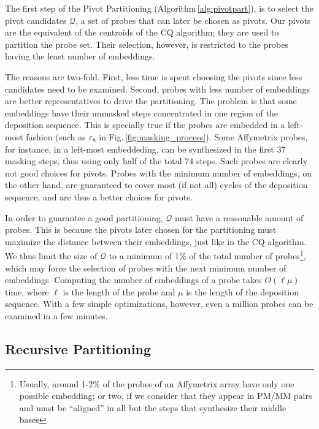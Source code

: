\documentclass[runningheads]{llncs}
\begin{document}
The first step of the Pivot Partitioning (Algorithm\,\ref{alg:pivotpart}), is to
select the pivot candidates $\mathcal{Q}$, a set of probes that can later be
chosen as pivots. Our pivots are the equivalent of the centroids of the CQ
algorithm; they are used to partition the probe set. Their
selection, however, is restricted to the probes having the least number of
embeddings.

The reasons are two-fold. First, less time is spent choosing the pivots
since less candidates need to be examined.
Second, probes with less number of embeddings are better representatives to drive
the partitioning. The problem is that some embeddings have their unmasked steps
concentrated in one region of the deposition sequence. This is specially true if
the probes are embedded in a left-most fashion (such as $\varepsilon_8$ in
Fig.\,\ref{fig:masking_process}). Some Affymetrix probes, for instance, in a
left-most embeddeding, can be synthesized in the first 37 masking steps, thus
using only half of the total 74 steps. Such probes are clearly not good choices
for pivots. Probes with the minimum number of embeddings, on the other hand,
are guaranteed to cover most (if not all) cycles of the deposition sequence,
and are thus a better choices for pivots.

In order to guarantee a good partitioning, $\mathcal{Q}$ must have a reasonable
amount of probes. This is because the pivots later chosen for the partitioning
must maximize the distance between their embeddings, just like in the CQ
algorithm. We thus limit the size of $\mathcal{Q}$ to a minimum of 1\% of the total
number of probes\footnote{Usually, around 1-2\% of the probes of an Affymetrix array
have only one possible embedding; or two, if we consider that they appear in PM/MM
pairs and must be ``aligned'' in all but the steps that synthesize their middle
bases}, which may force the selection of probes with the next minimum
number of embeddings.
Computing the number of embeddings of a probe takes $O(\ell \mu)$ time, where
$\ell$ is the length of the probe and $\mu$ is the length of the deposition sequence.
With a few simple optimizations, however, even a million probes can be examined in
a few minutes.

\subsection{Recursive Partitioning}
\end{document}

